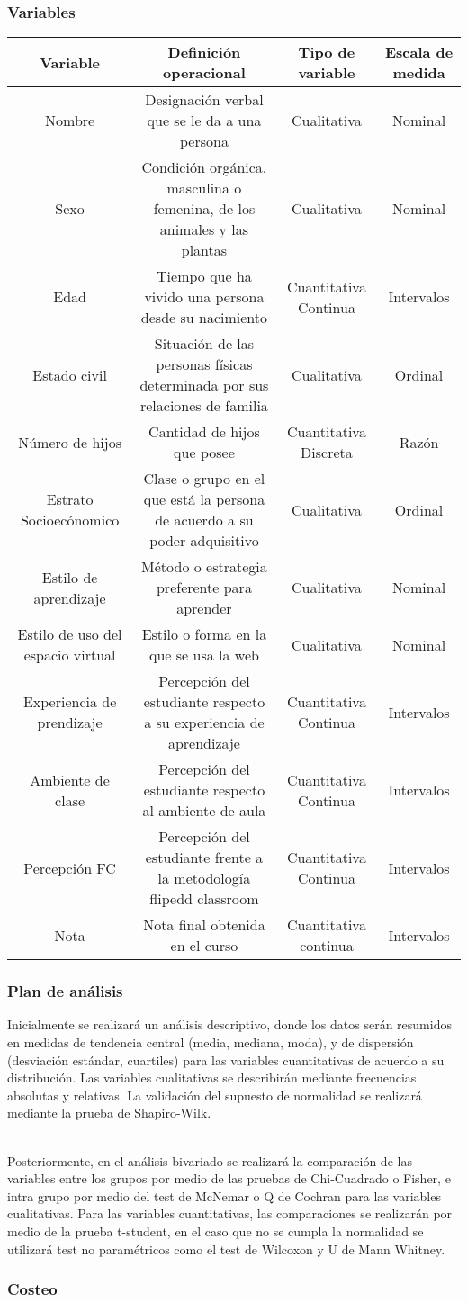 \documentclass[12pt]{beamer}
\begin{document}
\begin{frame}
\frametitle{Variables}
\resizebox{12cm}{!} {
\begin{tabular}{|c|c|c|c|}
\hline 
Variable & Definición operacional & Tipo de variable & Escala de medida \\ 
\hline 
Nombre & Designación verbal que se le da a una persona & Cualitativa & Nominal \\ 
Sexo & Condición orgánica, masculina o femenina, de los animales y las plantas & Cualitativa & Nominal \\ 
Edad & Tiempo que ha vivido una persona desde su nacimiento & Cuantitativa Continua & Intervalos \\ 
Estado civil & Situación de las personas físicas determinada por sus relaciones de familia & Cualitativa & Ordinal \\ 
Número de hijos & Cantidad de hijos que posee & Cuantitativa Discreta & Razón \\ 
Estrato Socioecónomico & Clase o grupo en el que está la persona de acuerdo a su poder adquisitivo & Cualitativa & Ordinal \\ 
Estilo de aprendizaje & Método o estrategia preferente para aprender & Cualitativa & Nominal \\ 
Estilo de uso del espacio virtual & Estilo o forma en la que se usa la web & Cualitativa & Nominal \\ 
Experiencia de prendizaje & Percepción del estudiante respecto a su experiencia de aprendizaje  & Cuantitativa Continua & Intervalos \\ 
Ambiente de clase & Percepción del estudiante respecto al ambiente de aula & Cuantitativa Continua & Intervalos \\ 
Percepción FC & Percepción del estudiante frente a la metodología flipedd classroom & Cuantitativa Continua & Intervalos \\
Nota & Nota final obtenida en el curso & Cuantitativa continua & Intervalos \\ 
\hline 
\end{tabular} 
}
\end{frame}

\begin{frame}
\frametitle{Plan de análisis}
Inicialmente se realizará un análisis descriptivo, donde los datos serán resumidos en medidas de tendencia central (media, mediana, moda), y de dispersión (desviación estándar, cuartiles) para las variables cuantitativas de acuerdo a su distribución. Las variables cualitativas se describirán mediante frecuencias absolutas y relativas. La validación del supuesto de normalidad se realizará mediante la prueba de Shapiro-Wilk.

~\\Posteriormente, en el análisis bivariado se realizará la comparación de las variables entre los grupos por medio de las pruebas de Chi-Cuadrado o Fisher, e intra grupo por medio del test de McNemar o Q de Cochran para las variables cualitativas. Para las variables cuantitativas, las comparaciones se realizarán por medio de la prueba t-student, en el caso que no se cumpla la normalidad se utilizará test no paramétricos como el test de Wilcoxon y U de Mann Whitney.
\end{frame}

\begin{frame}
\frametitle{Costeo}
\end{frame}
\end{document}
